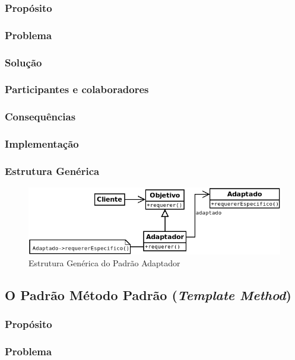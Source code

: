\subsubsection{Propósito}
\subsubsection{Problema}
\subsubsection{Solução}
\subsubsection{Participantes e colaboradores}
\subsubsection{Consequências}
\subsubsection{Implementação}
\subsubsection{Estrutura Genérica}

\begin{figure}[h]
\begin{center}
\includegraphics[scale=0.6]{adaptador.png}
\caption{Estrutura Genérica do Padrão Adaptador}\label{fig:adaptador}
\end{center}
\end{figure}

\subsection{O Padrão Método Padrão (\textit{Template Method})}
\subsubsection{Propósito}
\subsubsection{Problema}
